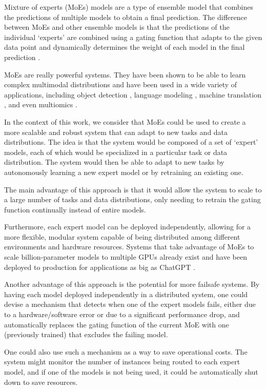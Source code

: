 \documentclass[../main.tex]{subfiles}
\begin{document}
    Mixture of experts (MoEs) models are a type of ensemble model that combines the predictions of multiple models to obtain a final prediction. The difference between MoEs and other ensemble models is that the predictions of the individual `experts' are combined using a gating function that adapts to the given data point and dynamically determines the weight of each model in the final prediction \cite{chen_towards_2022}.

    MoEs are really powerful systems. They have been shown to be able to learn complex multimodal distributions and have been used in a wide variety of applications, including object detection \cite{hwang_tutel_2023}, language modeling \cite{mustafa_multimodal_2022}, machine translation \cite{shazeer_outrageously_2017}, and even multiomics \cite{minoura_scmm_2021}.
    
    In the context of this work, we consider that MoEs could be used to create a more scalable and robust system that can adapt to new tasks and data distributions. The idea is that the system would be composed of a set of `expert' models, each of which would be specialized in a particular task or data distribution. The system would then be able to adapt to new tasks by autonomously learning a new expert model or by retraining an existing one.
    
    The main advantage of this approach is that it would allow the system to scale to a large number of tasks and data distributions, only needing to retrain the gating function continually instead of entire models. 
    
    Furthermore, each expert model can be deployed independently, allowing for a more flexible, modular system capable of being distributed among different environments and hardware resources. Systems that take advantage of MoEs to scale billion-parameter models to multiple GPUs already exist and have been deployed to production for applications as big as ChatGPT .
    
    Another advantage of this approach is the potential for more failsafe systems. By having each model deployed independently in a distributed system, one could devise a mechanism that detects when one of the expert models fails, either due to a hardware/software error or due to a significant performance drop, and automatically replaces the gating function of the current MoE with one (previously trained) that excludes the failing model.
    
    One could also use such a mechanism as a way to save operational costs. The system might monitor the number of instances being routed to each expert model, and if one of the models is not being used, it could be automatically shut down to save resources.
    
\end{document}
